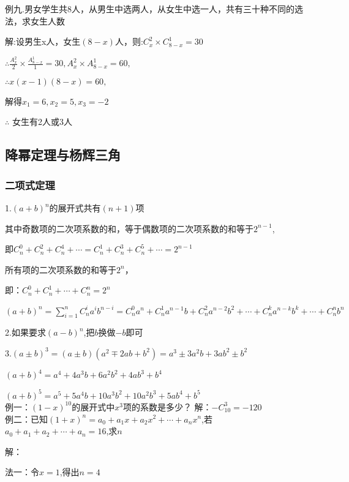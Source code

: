 \documentclass[UTF8]{ctexart}
\begin{document}
例九.男女学生共8人，从男生中选两人，从女生中选一人，共有三十种不同的选法，求女生人数

解:设男生x人，女生$(8-x)$人，则:$C_{x}^{2} \times C_{8-x}^{1} =30$

$\therefore \frac{A_{x}^{2} }{2} \times \frac{A_{8-x}^{1} }{1}=30,A_{x}^{2} \times A_{8-x}^{1}
=60,$

$\therefore x(x-1)(8-x)=60,$

解得$x_{1} =6,x_{2} =5,x_{3} =-2$

$\therefore $ 女生有2人或3人

\subsection{降幂定理与杨辉三角}

\subsubsection{二项式定理}


1.$(a+b)^{n}$的展开式共有$(n+1)$项

其中奇数项的二次项系数的和，等于偶数项的二次项系数的和等于$2^{n-1}$,

即$C_{n}^{0} +C_{n}^{2} +C_{n}^{4} +\cdots =C_{n}^{1}
+C_{n}^{3}+C_{n}^{5} +\cdots =2^{n-1}$

所有项的二次项系数的和等于$2^{n}$，

即：$C_{n}^{0} +C_{n}^{1} +\cdots +C_{n}^{n} =2^{n}$

$(a+b)^{n}=\displaystyle \sum_{i=1}^{n} C_{n}^{i} a^{i}b^{n-i}=C_{n}^{0} a^{n}+C_{n}^{1} a^{n-1}b+C_{n}^{2} a^{n-2}b^{2}+\cdots +C_{n}^{k} a^{n-k}b^{k}+\cdots
+C_{n}^{n} b^{n}$

2.如果要求$(a-b)^n$,把$b$换做$-b$即可

3.$(a\pm b)^3=(a\pm b)(a^{2}\mp 2ab+b^{2})=a^{3}\pm 3a^{2}b+3ab^{2}\pm b^{2}$

$(a+b)^{4}=a^{4}+4a^{3}b+6a^{2}b^{2}+4ab^{3}+b^{4}$

$(a+b)^{5}=a^{5}+5a^{4}b+10a^{3}b^{2}+10a^{2}b^{3}+5ab^{4}+b^{5}$
\\

例一：$(1-x)^{10}$的展开式中$x^{3}$项的系数是多少？
解：$-C_{10}^{3} =-120$
\\

例二：已知$(1+x)^n=a_{0} +a_{1} x+a_{2} x^{2} +\cdots +a_{n} x^{n} $,若$a_{0} +a_{1} +a_{2} +\cdots
+a_{n} =16$,求$n$

解：

法一：令$x=1$,得出$n=4$
\end{document}
